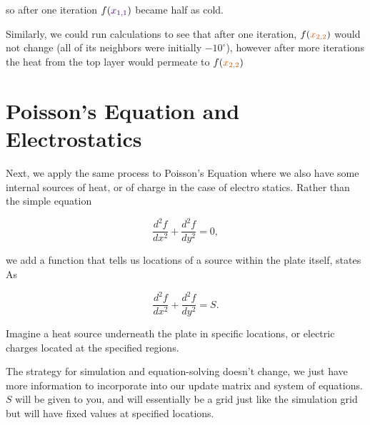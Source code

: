 \documentclass{ximera}
\begin{document}
so after one iteration $f(\textcolor{darkpurple}{x_{1,1}})$ became half as cold. 

Similarly, we could run calculations to see that after one iteration, $f(\textcolor{burntorange}{x_{2,2}})$ would not change (all of its neighbors were initially $-10^\circ$), however after more iterations the heat from the top layer would permeate to $f(\textcolor{burntorange}{x_{2,2}})$

\section{Poisson's Equation and Electrostatics}

Next, we apply the same process to Poisson's Equation where we also have some internal sources of heat, or of charge in the case of electro statics. Rather than the simple equation 

$$\frac{d^2f}{dx^2}+\frac{d^2f}{dy^2}=0,$$

we add a function that tells us locations of a source within the plate itself, states As

$$\frac{d^2f}{dx^2}+\frac{d^2f}{dy^2}=S.$$

Imagine a heat source underneath the plate in specific locations, or electric charges located at the specified regions. 

The strategy for simulation and equation-solving doesn't change, we just have more information to incorporate into our update matrix and system of equations. $S$ will be given to you, and will essentially be a grid just like the simulation grid but will have fixed values at specified locations. 
\end{document}
